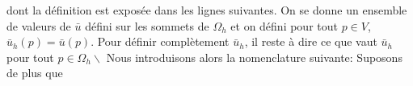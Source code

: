 \[\]

dont la définition est exposée dans les lignes suivantes. On se donne un ensemble de valeurs de $\bar{u}$ défini sur les sommets de $\Omega_h$ et on défini pour tout $p\in V$, $\bar{u}_h(p)=\bar{u}(p)$. Pour définir complètement $\bar{u}_h$, il reste à dire ce que vaut $\bar{u}_h$ pour tout $p\in\Omega_h\backslash$  Nous introduisons alors la nomenclature suivante: Suposons de plus que

\newpage

